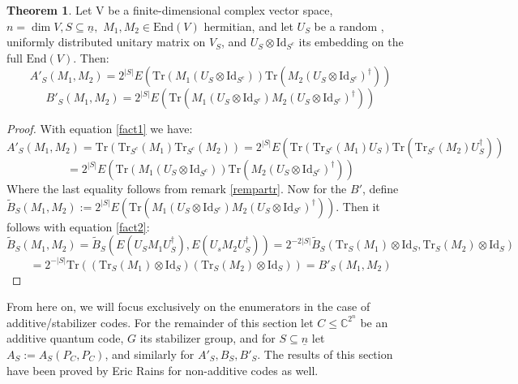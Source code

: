 \documentclass{article}
\def\C{\mathbb{C}}
\def\n{\underline{n}}
\def\End{\text{End}}
\def\Tr{\text{Tr}}
\def\Id{\text{Id}}
\newenvironment{bew}{\begin{proof}[Proof]}{\end{proof}}
\theoremstyle{definition}
\newtheorem{theorem}[Satz]{Theorem}
\begin{document}
\begin{theorem}\label{expectedvalues}%
Let V be a finite-dimensional complex vector space, $n = \dim V, S \subseteq \n,$ $M_1, M_2 \in \End(V)$ hermitian, and let $U_S$ be a random , uniformly distributed unitary matrix on $V_S$, and $U_S \otimes \Id_{S^c}$ its embedding on the full $\End(V)$. Then:
\begin{equation} A'_S(M_1,M_2) = 2^{|S|} E( \Tr(M_1 (U_S \otimes \Id_{S^c})) \Tr(M_2 (U_S \otimes \Id_{S^c})^\dagger )) \end{equation}
\begin{equation} B'_S(M_1,M_2) = 2^{|S|} E( \Tr(M_1 (U_S \otimes \Id_{S^c}) M_2 (U_S \otimes \Id_{S^c})^\dagger)) \end{equation}
\begin{bew}
With equation \ref{fact1} we have: \begin{equation*} A'_S(M_1, M_2) = \Tr(\Tr_{S^c}(M_1)\Tr_{S^c}(M_2)) = 2^{|S|} E(\Tr(\Tr_{S^c}(M_1) U_S) \Tr( \Tr_{S^c}(M_2) U_S^\dagger)) \end{equation*} \begin{equation*} = 2^{|S|} E(\Tr(M_1 (U_S \otimes \Id_{S^c})) \Tr(M_2 (U_S \otimes \Id_{S^c})^\dagger)) \end{equation*} 
Where the last equality follows from remark \ref{rempartr}.
Now for the $B'$, define $\tilde B_S(M_1, M_2) :=   2^{|S|} E( \Tr(M_1 (U_S \otimes \Id_{S^c}) M_2 (U_S \otimes \Id_{S^c})^\dagger))$. Then it follows with equation \ref{fact2}: 
\begin{equation*}
\tilde B_S(M_1,M_2) = \tilde B_S( E(U_S M_1 U_S^\dagger), E(U_s M_2 U_S^\dagger)) = 2^{-2|S|} \tilde B_S( \Tr_S(M_1) \otimes \Id_S, \Tr_S(M_2) \otimes \Id_S) \end{equation*}
\begin{equation*} = 2^{-|S|} \Tr((\Tr_S(M_1) \otimes \Id_S)(\Tr_S(M_2) \otimes \Id_S)) = B'_S(M_1,M_2)\end{equation*}
\end{bew}
\end{theorem}



From here on, we will focus exclusively on the enumerators in the case of additive/stabilizer codes. For the remainder of this section let $C \leq \C^{2^n}$ be an additive quantum code, $G$ its stabilizer group, and for $S \subseteq \n$ let $A_S:= A_S(P_C,P_C)$, and similarly for $A'_S, B_S, B'_S$. The results of this section have been proved by Eric Rains \cite{quantumweightenums} for non-additive codes as well.
\end{document}
